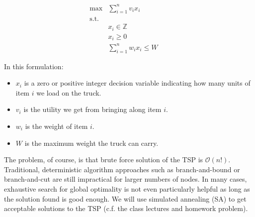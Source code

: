 \documentclass{article} %
\begin{document}
\begin{align*}
\max &\sum_{i=1}^n v_i x_i &&  \\
\mathrm{s.t.} & \\
    & x_i \in \mathbb{Z} \\
    & x_i \geq 0 \\
	& \sum_{i=1}^n w_ix_i \leq W
\end{align*}

In this formulation:

\begin{itemize}
  \item $x_{i}$ is a zero or positive integer decision variable indicating how many units of item $i$
        we load on the truck.
  \item $v_i$ is the utility we get from bringing along item $i$.
  \item $w_i$ is the weight of item $i$.
  \item $W$ is the maximum weight the truck can carry.
\end{itemize}

The problem, of course, is that brute force solution of the TSP is $\mathcal{O}$$(n!)$. Traditional, deterministic
algorithm approaches such as branch-and-bound or branch-and-cut are still impractical for larger numbers of nodes.
In many cases, exhaustive search for global optimality is not even particularly helpful as long as the solution
found is good enough. We will use simulated annealing (SA) to get acceptable solutions to the TSP (c.f. the class lectures
and homework problem).
\end{document}
